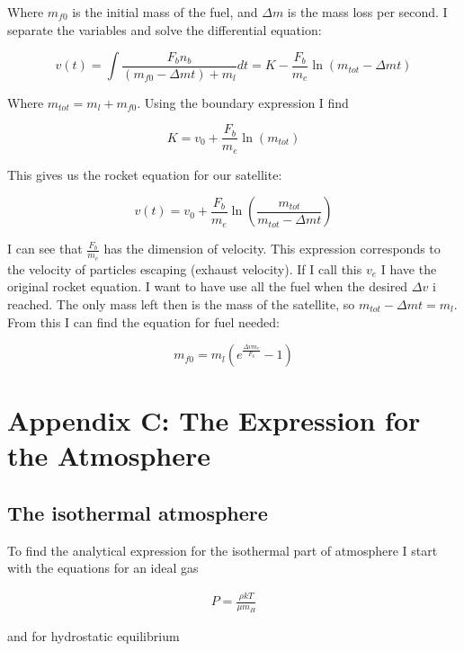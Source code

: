 \documentclass[a4paper, 10pt]{article}
\begin{document}
Where $m_{f0}$ is the initial mass of the fuel, and $\Delta m$ is the mass loss per second. I separate the variables and solve the differential equation:

\begin{equation}
v(t) = \int \frac{F_b n_b}{(m_{f0} - \Delta m t) + m_l} dt
= K - \frac{F_b}{m_e} \ln(m_{tot} - \Delta m t) 
\end{equation}

Where $m_{tot} = m_l + m_{f0}$. Using the boundary expression I find

\begin{equation}
K = v_0 + \frac{F_b}{m_e} \ln (m_{tot})
\end{equation}

This gives us the rocket equation for our satellite: 

\begin{equation}
v(t) =v_0 + \frac{F_b}{m_e} \ln \left(\frac{m_{tot}}{m_{tot} - \Delta m t} \right)
\end{equation}

I can see that $\frac{F_b}{m_e}$ has the dimension of velocity. This expression corresponds to the velocity of particles escaping (exhaust velocity). If I call this $v_e$ I have the original rocket equation. I want to have use all the fuel when the desired $\Delta v$ i reached. The only mass left then is the mass of the satellite, so $m_{tot} - \Delta m t = m_l$. From this I can find the equation for fuel needed:

\begin{equation}
m_{f0} = m_l(e^{\frac{\Delta v m_e}{F_b}} - 1)
\end{equation}


\section{Appendix C: The Expression for the Atmosphere}\label{sec:atmosphere}
\subsection{The isothermal atmosphere}
To find the analytical expression for the isothermal part of atmosphere I start with the equations for an ideal gas \cite{1e}

\begin{align}\label{eq:idealgas}
P = \frac{\rho kT}{\mu m_H}
\end{align}

and for hydrostatic equilibrium 
\end{document}

